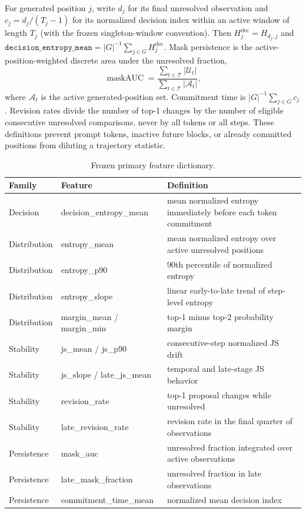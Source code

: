 For generated position $j$, write $d_j$ for its final unresolved observation
and $c_j=d_j/(T_j-1)$ for its normalized decision index within an active window
of length $T_j$ (with the frozen singleton-window convention). Then
$H_j^{\mathrm{dec}}=H_{d_j,j}$ and
$\texttt{decision\_entropy\_mean}=|G|^{-1}\sum_{j\in G}H_j^{\mathrm{dec}}$.
Mask persistence is the active-position-weighted discrete area under the
unresolved fraction,
\begin{equation}
\operatorname{maskAUC}=
\frac{\sum_{t\in\mathcal{T}}|\mathcal{U}_t|}
{\sum_{t\in\mathcal{T}}|\mathcal{A}_t|},
\end{equation}
where $\mathcal{A}_t$ is the active generated-position set. Commitment time is
$|G|^{-1}\sum_{j\in G}c_j$. Revision rates divide the number of top-1 changes
by the number of eligible consecutive unresolved comparisons, never by all
tokens or all steps. These definitions prevent prompt tokens, inactive future
blocks, or already committed positions from diluting a trajectory statistic.

\begin{table}[t]
\centering
\small
\setlength{\tabcolsep}{3pt}
\begin{tabular}{@{}p{}p{}p{}@{}}
\toprule
Family & Feature & Definition\\
\midrule
Decision & decision\_entropy\_mean & mean normalized entropy immediately before each token commitment\\
Distribution & entropy\_mean & mean normalized entropy over active unresolved positions\\
Distribution & entropy\_p90 & 90th percentile of normalized entropy\\
Distribution & entropy\_slope & linear early-to-late trend of step-level entropy\\
Distribution & margin\_mean / margin\_min & top-1 minus top-2 probability margin\\
Stability & js\_mean / js\_p90 & consecutive-step normalized JS drift\\
Stability & js\_slope / late\_js\_mean & temporal and late-stage JS behavior\\
Stability & revision\_rate & top-1 proposal changes while unresolved\\
Stability & late\_revision\_rate & revision rate in the final quarter of observations\\
Persistence & mask\_auc & unresolved fraction integrated over active observations\\
Persistence & late\_mask\_fraction & unresolved fraction in late observations\\
Persistence & commitment\_time\_mean & normalized mean decision index\\
\bottomrule
\end{tabular}
\caption{Frozen primary feature dictionary.}
\end{table}

